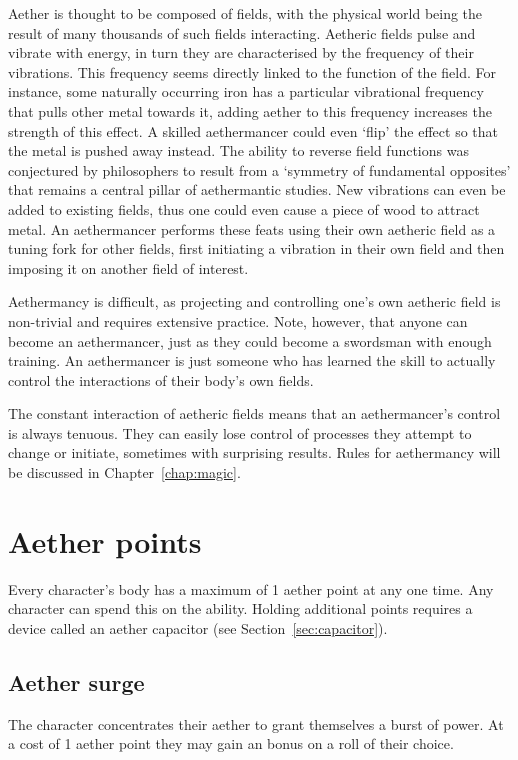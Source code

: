 \documentclass[a4paper,11pt,oneside]{book}
\newcommand{\textlf}[1]{\textbf{\titlecap{#1}}}
\begin{document}
Aether is thought to be composed of fields, with the physical world being the result of many thousands of such fields interacting. Aetheric fields pulse and vibrate with energy, in turn they are characterised by the frequency of their vibrations. This frequency seems directly linked to the function of the field. For instance, some naturally occurring iron has a particular vibrational frequency that pulls other metal towards it, adding aether to this frequency increases the strength of this effect. A skilled aethermancer could even `flip' the effect so that the metal is pushed away instead. The ability to reverse field functions was conjectured by philosophers to result from a `symmetry of fundamental opposites' that remains a central pillar of aethermantic studies. New vibrations can even be added to existing fields, thus one could even cause a piece of wood to attract metal. An aethermancer performs these feats using their own aetheric field as a tuning fork for other fields, first initiating a vibration in their own field and then imposing it on another field of interest.

Aethermancy is difficult, as projecting and controlling one's own aetheric field is non-trivial and requires extensive practice. Note, however, that anyone can become an aethermancer, just as they could become a swordsman with enough training. An aethermancer is just someone who has learned the skill to actually control the interactions of their body's own fields. 

The constant interaction of aetheric fields means that an aethermancer's control is always tenuous. They can easily lose control of processes they attempt to change or initiate, sometimes with surprising results. Rules for aethermancy will be discussed in Chapter~\ref{chap:magic}.

\section{Aether points}
Every character's body has a maximum of 1 aether point at any one time. Any character can spend this on the \textlf{aether surge} ability. Holding additional points requires a device called an aether capacitor (see Section~\ref{sec:capacitor}).

\subsection{Aether surge}
The character concentrates their aether to grant themselves a burst of power. At a cost of 1 aether point they may gain an \textlf{edge} bonus on a roll of their choice.
\end{document}
